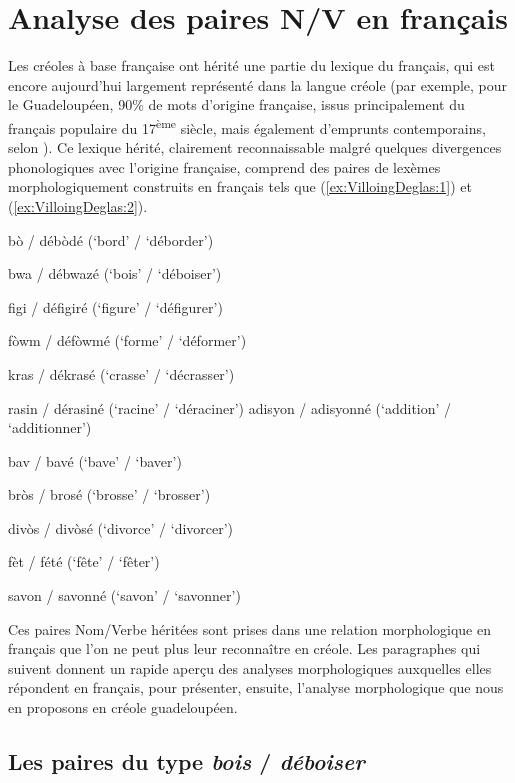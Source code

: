 \documentclass[output=paper]{langsci/langscibook}
\begin{document}
\section{Analyse des paires N/V en
français}\label{section:VilloingDeglas:analyse-des-paires-nv-en-français}

Les créoles à base française ont hérité une partie du lexique du
français, qui est encore aujourd'hui largement représenté dans la langue
créole (par exemple, pour le Guadeloupéen, 90\% de mots d'origine
française, issus principalement du français populaire du 17\textsuperscript{ème} siècle,
mais également d'emprunts contemporains, selon %
\citealt{HazaelMassieux2002}%
%
%
). Ce
lexique hérité, clairement reconnaissable malgré quelques divergences
phonologiques avec l'origine française, comprend des paires de lexèmes
morphologiquement construits en français tels que (\ref{ex:VilloingDeglas:1}) et (\ref{ex:VilloingDeglas:2}).

\ea\label{ex:VilloingDeglas:1}
  \ea bò / débòdé  (`bord' / `déborder')

  \ex bwa / débwazé (`bois' / `déboiser')

  \ex figi / défigiré (`figure' / `défigurer')

  \ex fòwm / défòwmé (`forme' / `déformer')

  \ex kras / dékrasé (`crasse' / `décrasser')

  \ex rasin / dérasiné (`racine' / `déraciner')
  \z
\ex\label{ex:VilloingDeglas:2}
  \ea adisyon / adisyonné (`addition' / `additionner')

  \ex bav / bavé (`bave' / `baver')

  \ex bròs / brosé (`brosse' / `brosser')

  \ex divòs / divòsé (`divorce' / `divorcer')

  \ex fèt / fété (`fête' / `fêter')

  \ex savon / savonné (`savon' / `savonner')
\z\z

Ces paires Nom/Verbe héritées sont prises dans une relation
morphologique en français que l'on ne peut plus leur reconnaître en
créole. Les paragraphes qui suivent donnent un rapide aperçu des
analyses morphologiques auxquelles elles répondent en français, pour
présenter, ensuite, l'analyse morphologique que nous en proposons en
créole guadeloupéen.

\subsection{Les paires du type \emph{bois} / \emph{déboiser}}\label{subsection:VilloingDeglas:les-paires-du-type-bois-déboiser}
\label{sec:vg:2.1.1.}
\end{document}
